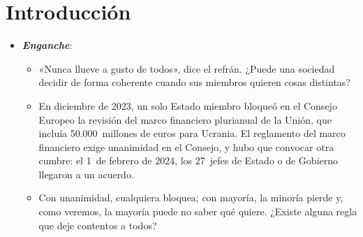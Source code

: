 \documentclass[11pt]{article}
\begin{document}
\tceetitulo

\section*{Introducción}

\begin{itemize}
\item \textbf{\emph{Enganche}}:
  \begin{itemize}
  \item «Nunca llueve a gusto de todos», dice el refrán. ¿Puede una sociedad decidir de forma coherente cuando sus miembros quieren cosas distintas?
  \item En diciembre de 2023, un solo Estado miembro bloqueó en el Consejo Europeo la revisión del marco financiero plurianual de la Unión, que incluía 50.000~millones de euros para Ucrania. El reglamento del marco financiero exige unanimidad en el Consejo\nocite{UE2016TFUE312}, y hubo que convocar otra cumbre: el 1~de febrero de 2024, los 27~jefes de Estado o de Gobierno llegaron a un acuerdo\nocite{ConsejoEuropeo2024Conclusiones}.
  \item Con unanimidad, cualquiera bloquea; con mayoría, la minoría pierde y, como veremos, la mayoría puede no saber qué quiere. ¿Existe alguna regla que deje contentos a todos?
  \end{itemize}


\end{itemize}
\end{document}
